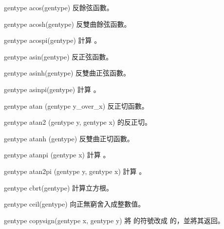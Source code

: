 gentype acos(gentype)
\stopbuffer
{}
反餘弦函數。
\stopbuffer

gentype acosh(gentype)
\stopbuffer
{}
反雙曲餘弦函數。
\stopbuffer

gentype acospi(gentype)
\stopbuffer
{}
計算 。
\stopbuffer

gentype asin(gentype)
\stopbuffer
{}
反正弦函數。
\stopbuffer

gentype asinh(gentype)
\stopbuffer
{}
反雙曲正弦函數。
\stopbuffer

gentype asinpi(gentype)
\stopbuffer
{}
計算 。
\stopbuffer

gentype atan (gentype y_over_x)
\stopbuffer
{}
反正切函數。
\stopbuffer

gentype atan2 (gentype y, gentype x)
\stopbuffer
{}
 的反正切。
\stopbuffer

gentype atanh (gentype)
\stopbuffer
{}
反雙曲正切函數。
\stopbuffer

gentype atanpi (gentype x)
\stopbuffer
{}
計算 。
\stopbuffer

gentype atan2pi (gentype y, gentype x)
\stopbuffer
{}
計算 。
\stopbuffer

gentype cbrt(gentype)
\stopbuffer
{}
計算立方根。
\stopbuffer

gentype ceil(gentype)
\stopbuffer
{}
向正無窮舍入成整數值。
\stopbuffer

gentype copysign(gentype x,
		 gentype y)
\stopbuffer
{}
將  的符號改成  的，並將其返回。
\stopbuffer

